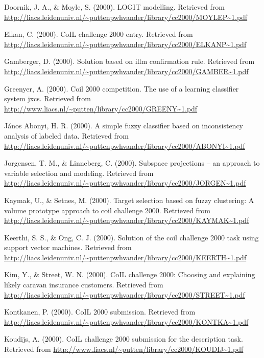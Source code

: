 \documentclass[man]{apa6}
\begin{document}
\leavevmode\hypertarget{ref-Doornik}{}%
Doornik, J. A., \& Moyle, S. (2000). LOGIT modelling. Retrieved from \url{http://liacs.leidenuniv.nl/~puttenpwhvander/library/cc2000/MOYLEP~1.pdf}

\leavevmode\hypertarget{ref-Elkan}{}%
Elkan, C. (2000). CoIL challenge 2000 entry. Retrieved from \url{http://liacs.leidenuniv.nl/~puttenpwhvander/library/cc2000/ELKANP~1.pdf}

\leavevmode\hypertarget{ref-Gamberger}{}%
Gamberger, D. (2000). Solution based on illm confirmation rule. Retrieved from \url{http://liacs.leidenuniv.nl/~puttenpwhvander/library/cc2000/GAMBER~1.pdf}

\leavevmode\hypertarget{ref-Greenyer}{}%
Greenyer, A. (2000). Coil 2000 competition. The use of a learning classifier system jxcs. Retrieved from \url{http://www.liacs.nl/~putten/library/cc2000/GREENY~1.pdf}

\leavevmode\hypertarget{ref-Abonyi}{}%
János Abonyi, H. R. (2000). A simple fuzzy classifier based on inconsistency analysis of labeled data. Retrieved from \url{http://liacs.leidenuniv.nl/~puttenpwhvander/library/cc2000/ABONYI~1.pdf}

\leavevmode\hypertarget{ref-Jorgensen}{}%
Jorgensen, T. M., \& Linneberg, C. (2000). Subspace projections -- an approach to variable selection and modeling. Retrieved from \url{http://liacs.leidenuniv.nl/~puttenpwhvander/library/cc2000/JORGEN~1.pdf}

\leavevmode\hypertarget{ref-Kaymak}{}%
Kaymak, U., \& Setnes, M. (2000). Target selection based on fuzzy clustering: A volume prototype approach to coil challenge 2000. Retrieved from \url{http://liacs.leidenuniv.nl/~puttenpwhvander/library/cc2000/KAYMAK~1.pdf}

\leavevmode\hypertarget{ref-Keerthi}{}%
Keerthi, S. S., \& Ong, C. J. (2000). Solution of the coil challenge 2000 task using support vector machines. Retrieved from \url{http://liacs.leidenuniv.nl/~puttenpwhvander/library/cc2000/KEERTH~1.pdf}

\leavevmode\hypertarget{ref-Kim}{}%
Kim, Y., \& Street, W. N. (2000). CoIL challenge 2000: Choosing and explaining likely caravan insurance customers. Retrieved from \url{http://liacs.leidenuniv.nl/~puttenpwhvander/library/cc2000/STREET~1.pdf}

\leavevmode\hypertarget{ref-Kontkanen}{}%
Kontkanen, P. (2000). CoIL 2000 submission. Retrieved from \url{http://liacs.leidenuniv.nl/~puttenpwhvander/library/cc2000/KONTKA~1.pdf}

\leavevmode\hypertarget{ref-Koudijs}{}%
Koudijs, A. (2000). CoIL challenge 2000 submission for the description task. Retrieved from \url{http://www.liacs.nl/~putten/library/cc2000/KOUDIJ~1.pdf}
\end{document}
